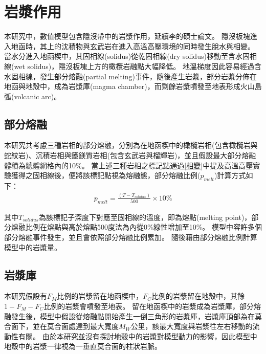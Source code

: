 \section{岩漿作用}
本研究中，數值模型包含隱沒帶中的岩漿作用，延續李的碩士論文。
隱沒板塊進入地函時，其上的沈積物與玄武岩在進入高溫高壓環境的同時發生脫水與相變。
當水分進入地函楔中，其固相線(solidus)從乾固相線(dry solidus)移動至含水固相線(wet solidus)，隱沒板塊上方的橄欖岩融點大幅降低。
地溫梯度因此容易經過含水固相線，發生部分熔融(partial melting)事件，隨後產生岩漿，部分岩漿分佈在地函與地殼中，成為岩漿庫(magma chamber)，而剩餘岩漿噴發至地表形成火山島弧(volcanic arc)。
\subsection{部分熔融}\label{部分熔融}
本研究共考慮三種岩相的部分熔融，分別為在地函楔中的橄欖岩相(包含橄欖岩與蛇紋岩)、沉積岩相與鐵鎂質岩相(包含玄武岩與榴輝岩)，並且假設最大部分熔融體積為總體網格內的10$\%$。
當上述三種岩相之標記點通過\ref{相變}中提及高溫高壓實驗獲得之固相線後，便將該標記點視為熔融態，部分熔融比例($p_{melt}$)計算方式如下：
\begin{align}
    p_{melt}=\frac{(T-T_{solidus})}{500}\times 10\% \label{eq:melting}
\end{align}

其中$T_{solidus}$為該標記子深度下對應至固相線的溫度，即為熔點(melting point)，部分熔融比例在熔點與高於熔點500度法為內從0$\%$線性增加至10$\%$。
模型中容許多個部分熔融事件發生，並且會依照部分熔融比例累加。
隨後藉由部分熔融比例計算模型中的岩漿量。


\subsection{岩漿庫}\label{岩漿庫}
本研究假設有$F_M$比例的岩漿留在地函楔中，$F_C$比例的岩漿留在地殼中，其餘$1-F_M-F_C$比例的岩漿會噴發至地表。
留在地函楔中的岩漿成為岩漿庫，部分熔融發生後，模型中假設從熔融點開始產生一倒三角形的岩漿庫，岩漿庫頂部為在莫合面下，並在莫合面處達到最大寬度$M_W$公里，該最大寬度與岩漿往左右移動的流動性有關。
由於本研究並沒有探討地殼中的岩漿對模型動力的影響，因此模型中地殼中的岩漿一律視為一垂直莫合面的柱狀岩脈。


